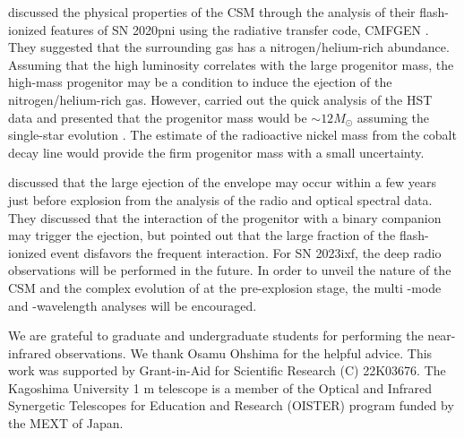 \documentclass{pasj01}
\begin{document}
\citet{Terreran2022} discussed the physical properties
of the CSM through the analysis of their flash-ionized features of SN 2020pni using the radiative transfer code, CMFGEN \citep{Hillier1998}. 
They suggested that the surrounding gas has a nitrogen/helium-rich abundance. 
Assuming that the high luminosity correlates with the large progenitor mass,
the high-mass progenitor may be a condition to induce the ejection 
of the nitrogen/helium-rich gas. 
However, \citet{Pledger2023} carried out the quick analysis 
of the HST data and presented that the progenitor mass 
would be $\sim12M_{\odot}$ assuming the single-star evolution .
The estimate of the radioactive nickel mass from the 
cobalt decay line would provide the firm progenitor mass 
with a small uncertainty.

\citet{Terreran2022} discussed that the large ejection 
of the envelope may occur within a few years just before explosion
from the analysis of the radio and optical spectral data.
They discussed that the interaction of the progenitor 
with a binary companion may trigger the ejection, 
but pointed out that the large fraction of the 
flash-ionized event \citep{Khazov2016,Bruch2022} disfavors 
the frequent interaction. For SN 2023ixf, the deep radio 
observations will be performed 
in the future. In order to unveil the nature of the 
CSM and the complex evolution of at the pre-explosion 
stage, the multi -mode and -wavelength analyses will be encouraged.

\begin{ack}
 We are grateful to graduate and undergraduate students for performing 
 the near-infrared observations. We thank Osamu Ohshima for the helpful advice. 
 This work was supported by Grant-in-Aid for Scientific Research (C) 
 22K03676. The Kagoshima University 1 m telescope is a member of the Optical and Infrared Synergetic Telescopes for Education and Research (OISTER) program funded by the MEXT of Japan.
\end{ack}


\end{document}
